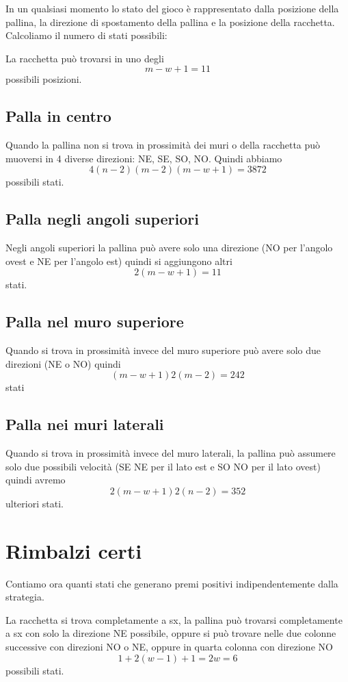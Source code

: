 \documentclass[a4paper,11pt]{article}
\begin{document}
In un qualsiasi momento lo stato del gioco è rappresentato dalla posizione
della pallina, la direzione di spostamento della pallina e la posizione della racchetta.
Calcoliamo il numero di stati possibili:

La racchetta può trovarsi in uno degli
\[m - w + 1 = 11 \] possibili posizioni.

\subsection{Palla in centro}

Quando la pallina non si trova in prossimità dei muri o della racchetta
può muoversi in 4 diverse direzioni: NE, SE, SO, NO.
Quindi abbiamo
\[ 4 (n-2)(m-2) (m - w + 1) = 3872 \]
possibili stati.

\subsection{Palla negli angoli superiori}

Negli angoli superiori la pallina può avere solo una direzione (NO per l'angolo ovest e NE per l'angolo est) quindi
si aggiungono altri 
\[
	2 (m - w +1) = 11
\] stati.

\subsection{Palla nel muro superiore}

Quando si trova in prossimità invece del muro superiore può avere solo due direzioni (NE o NO) quindi \[ (m - w + 1) 2 (m - 2) = 242 \] stati

\subsection{Palla nei muri laterali}

Quando si trova in prossimità invece del muro laterali, la pallina può assumere solo due possibili velocità (SE NE per il lato est e SO NO per il lato ovest) quindi avremo \[ 2 (m - w + 1) 2 (n - 2) = 352 \] ulteriori stati.


\section{Rimbalzi certi}

Contiamo ora quanti stati che generano premi positivi indipendentemente dalla strategia.

La racchetta si trova completamente a sx, la pallina può trovarsi completamente a sx con solo la direzione NE possibile, oppure si può trovare nelle due colonne successive con direzioni NO o NE, oppure in quarta colonna con direzione NO
\[ 1 + 2(w-1) + 1 = 2w =  6 \]
possibili stati.
\end{document}
